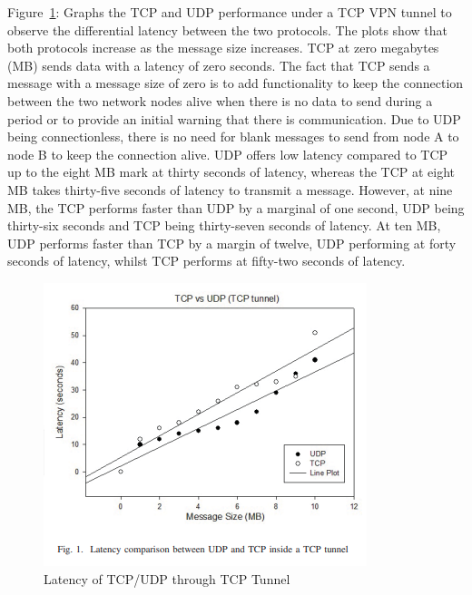 \documentclass[conference]{IEEEtran}
\begin{document}
      Figure~\ref{fig:tcpudp-tcptun}: Graphs the TCP and UDP performance under a TCP VPN tunnel to observe the differential latency between the two protocols. The plots show that both protocols increase as the message size increases. TCP at zero megabytes (MB) sends data with a latency of zero seconds. The fact that TCP sends a message with a message size of zero is to add functionality to keep the connection between the two network nodes alive when there is no data to send during a period or to provide an initial warning that there is communication. Due to UDP being connectionless, there is no need for blank messages to send from node A to node B to keep the connection alive. UDP offers low latency compared to TCP up to the eight MB mark at thirty seconds of latency, whereas the TCP at eight MB takes thirty-five seconds of latency to transmit a message. However, at nine MB, the TCP performs faster than UDP by a marginal of one second, UDP being thirty-six seconds and TCP being thirty-seven seconds of latency. At ten MB, UDP performs faster than TCP by a margin of twelve, UDP performing at forty seconds of latency, whilst TCP performs at fifty-two seconds of latency.
      \begin{figure}[h]
        \centering
        \includegraphics[width=\columnwidth]{Figures/TCPUDP-TCPTUN.png}
        \caption{Latency of TCP/UDP through TCP Tunnel~\cite{coonjah_experimental_2015}}
        \label{fig:tcpudp-tcptun}
      \end{figure}
\end{document}
